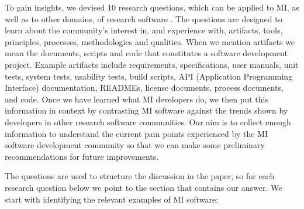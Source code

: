 \documentclass[final, 3p, times, authoryear]{elsarticle}
\begin{document}
To gain insights, we devised 10 research questions, which can be applied to MI,
as well as to other domains, of research software \citep{SmithEtAl2021}.  The
questions are designed to learn about the community's interest in, and
experience with, artifacts, tools, principles, processes, methodologies and
qualities.  When we mention artifacts we mean the documents, scripts and code
that constitutes a software development project. Example artifacts include
requirements, specifications, user manuals, unit tests, system tests, usability
tests, build scripts, API (Application Programming Interface) documentation,
READMEs, license documents, process documents, and code.  Once we have learned
what MI developers do, we then put this information in context by contrasting MI
software against the trends shown by developers in other research software
communities.  Our aim is to collect enough information to understand the current
pain points experienced by the MI software development community so that we can
make some preliminary recommendations for future improvements. 

The questions are used to structure the discussion in the paper, so for each
research question below we point to the section that contains our answer.  We
start with identifying the relevant examples of MI software:
\end{document}
